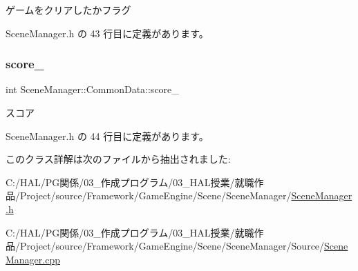 ゲームをクリアしたかフラグ 



 Scene\+Manager.\+h の 43 行目に定義があります。

\mbox{\label{class_scene_manager_1_1_common_data_a3ade74be49e90158640b6105a46de8e5}} 
\subsubsection{\texorpdfstring{score\+\_\+}{score\_}}
{\footnotesize\ttfamily int Scene\+Manager\+::\+Common\+Data\+::score\+\_\+\hspace{0.3cm}{\ttfamily [private]}}



スコア 



 Scene\+Manager.\+h の 44 行目に定義があります。



このクラス詳解は次のファイルから抽出されました\+:\begin{DoxyCompactItemize}
\item 
C\+:/\+H\+A\+L/\+P\+G関係/03\+\_\+作成プログラム/03\+\_\+\+H\+A\+L授業/就職作品/\+Project/source/\+Framework/\+Game\+Engine/\+Scene/\+Scene\+Manager/\mbox{\hyperlink{_scene_manager_8h}{Scene\+Manager.\+h}}\item 
C\+:/\+H\+A\+L/\+P\+G関係/03\+\_\+作成プログラム/03\+\_\+\+H\+A\+L授業/就職作品/\+Project/source/\+Framework/\+Game\+Engine/\+Scene/\+Scene\+Manager/\+Source/\mbox{\hyperlink{_scene_manager_8cpp}{Scene\+Manager.\+cpp}}\end{DoxyCompactItemize}
